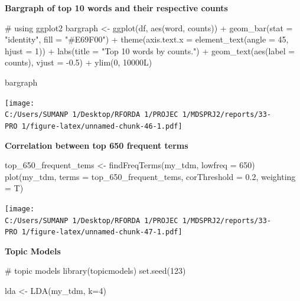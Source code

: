 \documentclass[
]{article}
\newenvironment{Shaded}{}{}
\newcommand{\AttributeTok}[1]{#1}
\newcommand{\CommentTok}[1]{\textcolor[rgb]{0.30,0.53,0.42}{#1}}
\newcommand{\DecValTok}[1]{\textcolor[rgb]{0.00,0.00,0.80}{#1}}
\newcommand{\FloatTok}[1]{\textcolor[rgb]{0.00,0.00,0.80}{#1}}
\newcommand{\FunctionTok}[1]{#1}
\newcommand{\NormalTok}[1]{#1}
\newcommand{\OtherTok}[1]{\textcolor[rgb]{1.00,0.25,0.00}{#1}}
\newcommand{\SpecialCharTok}[1]{\textcolor[rgb]{0.00,0.50,0.50}{#1}}
\newcommand{\StringTok}[1]{\textcolor[rgb]{0.01,0.42,0.03}{#1}}
\begin{document}
\textbf{Bargraph of top 10 words and their respective counts}

\begin{Shaded}
\begin{Highlighting}[]
\CommentTok{\# using ggplot2}
\NormalTok{bargraph }\OtherTok{\textless{}{-}} \FunctionTok{ggplot}\NormalTok{(df, }\FunctionTok{aes}\NormalTok{(word, counts)) }\SpecialCharTok{+}
  \FunctionTok{geom\_bar}\NormalTok{(}\AttributeTok{stat =} \StringTok{"identity"}\NormalTok{, }\AttributeTok{fill =} \StringTok{"\#E69F00"}\NormalTok{) }\SpecialCharTok{+}
  \FunctionTok{theme}\NormalTok{(}\AttributeTok{axis.text.x =} \FunctionTok{element\_text}\NormalTok{(}\AttributeTok{angle =} \DecValTok{45}\NormalTok{, }\AttributeTok{hjust =} \DecValTok{1}\NormalTok{)) }\SpecialCharTok{+}
  \FunctionTok{labs}\NormalTok{(}\AttributeTok{title =} \StringTok{"Top 10 words by counts."}\NormalTok{) }\SpecialCharTok{+}
  \FunctionTok{geom\_text}\NormalTok{(}\FunctionTok{aes}\NormalTok{(}\AttributeTok{label =}\NormalTok{ counts), }\AttributeTok{vjust =} \SpecialCharTok{{-}}\FloatTok{0.5}\NormalTok{) }\SpecialCharTok{+}
  \FunctionTok{ylim}\NormalTok{(}\DecValTok{0}\NormalTok{, 10000L)}

\NormalTok{bargraph}
\end{Highlighting}
\end{Shaded}

\texttt{[image: C:/Users/SUMANP~1/Desktop/RFORDA~1/PROJEC~1/MDSPRJ2/reports/33-PRO~1/figure-latex/unnamed-chunk-46-1.pdf]}

\textbf{Correlation between top 650 frequent terms}

\begin{Shaded}
\begin{Highlighting}[]
\NormalTok{top\_650\_frequent\_tems }\OtherTok{\textless{}{-}} \FunctionTok{findFreqTerms}\NormalTok{(my\_tdm, }\AttributeTok{lowfreq =} \DecValTok{650}\NormalTok{)}
\FunctionTok{plot}\NormalTok{(my\_tdm, }\AttributeTok{terms =}\NormalTok{ top\_650\_frequent\_tems, }\AttributeTok{corThreshold =} \FloatTok{0.2}\NormalTok{, }\AttributeTok{weighting =}\NormalTok{ T)}
\end{Highlighting}
\end{Shaded}

\texttt{[image: C:/Users/SUMANP~1/Desktop/RFORDA~1/PROJEC~1/MDSPRJ2/reports/33-PRO~1/figure-latex/unnamed-chunk-47-1.pdf]}

\textbf{Topic Models}

\begin{Shaded}
\begin{Highlighting}[]
\CommentTok{\# topic models}
\FunctionTok{library}\NormalTok{(topicmodels)}
\FunctionTok{set.seed}\NormalTok{(}\DecValTok{123}\NormalTok{)}

\NormalTok{lda }\OtherTok{\textless{}{-}} \FunctionTok{LDA}\NormalTok{(my\_tdm, }\AttributeTok{k=}\DecValTok{4}\NormalTok{)}
\end{Highlighting}
\end{Shaded}
\end{document}
